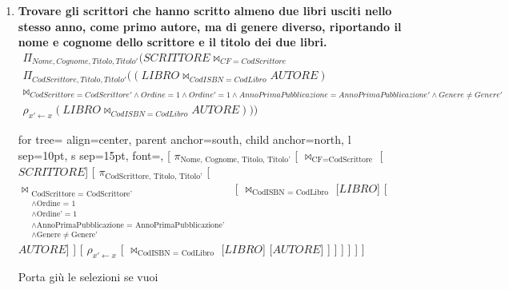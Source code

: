 \documentclass{article}
\begin{document}
\begin{enumerate}
	
	\item \textbf{Trovare gli scrittori che hanno scritto almeno due libri usciti nello stesso anno, come primo autore, ma di genere diverso, riportando il nome e cognome dello scrittore e il titolo dei due libri.}
	\begin{align*}
	\Pi_{Nome,Cognome,Titolo,Titolo'}(SCRITTORE \bowtie_{CF = CodScrittore}\\ \Pi_{CodScrittore,Titolo,Titolo'}((LIBRO \bowtie_{CodISBN = CodLibro} AUTORE) \\
	\bowtie_{CodScrittore = CodScrittore' \land Ordine = 1\land Ordine'=1 \land AnnoPrimaPubblicazione = AnnoPrimaPubblicazione' \land Genere \neq Genere'}\\
	\rho_{x'\leftarrow x}(LIBRO \bowtie_{CodISBN = CodLibro} AUTORE)))
	\end{align*}
	\begin{center}
		\begin{forest}
			for tree={
				align=center,
				parent anchor=south,
				child anchor=north,
				l sep=10pt,
				s sep=15pt,
				font=\sffamily,
			}
			[
			$\pi_{\text{Nome, Cognome, Titolo, Titolo'}}$
			[
			$\bowtie_{\text{CF} = \text{CodScrittore}}$
			[$SCRITTORE$]
			[
			$\pi_{\text{CodScrittore, Titolo, Titolo'}}$
			[
			$\bowtie_{\substack{
					\text{CodScrittore = CodScrittore'} \\
					\land \text{Ordine = 1} \\
					\land \text{Ordine'} = 1 \\
					\land \text{AnnoPrimaPubblicazione = AnnoPrimaPubblicazione'} \\
					\land \text{Genere} \ne \text{Genere'}
			}}$
			[
			$\bowtie_{\text{CodISBN = CodLibro}}$
			[$LIBRO$]
			[$AUTORE$]
			]
			[
			$\rho_{x' \leftarrow x}$
			[
			$\bowtie_{\text{CodISBN = CodLibro}}$
			[$LIBRO$]
			[$AUTORE$]
			]
			]
			]
			]
			]
			]
		\end{forest}
	\end{center}
	Porta giù le selezioni se vuoi
\end{enumerate}
\end{document}
